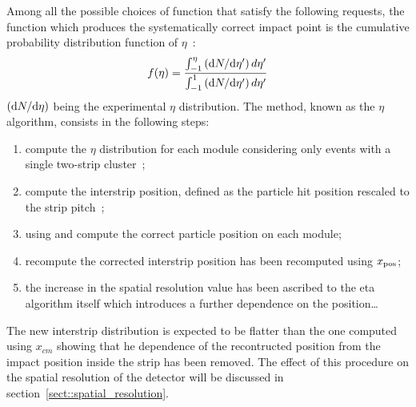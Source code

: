 Among all the possible choices of function that satisfy the following requests,
the function which produces the systematically correct impact point is
the cumulative probability distribution function of
$\eta$~\cite{Turchetta:1993vu}:
\begin{equation}\label{eq:f_eta}
  f(\eta)= \frac{\int_{-1}^{\eta} \left({\rm d} N/{\rm d} \eta'\right) d\eta' }{\int_{-1}^{1} \left({\rm d} N/{\rm d} \eta'\right) d\eta'}
\end{equation}
$\left({\rm d} N/{\rm d} \eta\right)$ being the experimental $\eta$
distribution. The method, known as the $\eta$ algorithm, consists in the
following steps:
\begin{enumerate}
\item compute the $\eta$ distribution for each module considering only events
  with a single two-strip cluster~;
\item compute the interstrip position, defined as the particle hit position rescaled to
  the strip pitch~;
\item using  and  compute the correct particle position on each module;
\item recompute the corrected interstrip position has been recomputed using
  $x_{\rm pos}$;
\item {\color{red} the increase in the spatial resolution value has been
    ascribed to the eta algorithm itself which introduces a further dependence
    on the position\ldots }
\end{enumerate}
The new interstrip distribution is expected to be flatter than the one computed
using $x_{cm}$ showing that he dependence of the recontructed position from the impact
position inside the strip has been removed. The effect of this procedure on the
spatial resolution of the detector will be discussed in
section~\ref{sect::spatial_resolution}.

